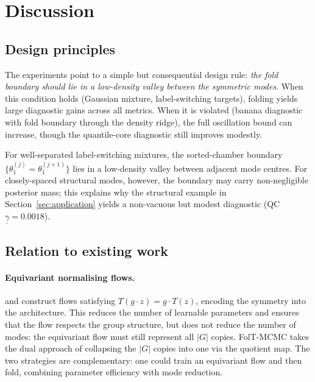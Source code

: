 %  

\section{Discussion}
\label{sec:discussion}


\subsection{Design principles}
\label{sec:disc_design}

The experiments point to a simple but consequential design rule:
\emph{the fold boundary should lie in a low-density valley between
the symmetric modes}.  When this condition holds (Gaussian mixture,
label-switching targets), folding yields large diagnostic gains
across all metrics.  When it is violated (banana diagnostic with
fold boundary through the density ridge), the full oscillation
bound can increase, though the quantile-core diagnostic still
improves modestly.

For well-separated label-switching mixtures, the sorted-chamber
boundary $\{\theta_1^{(j)} = \theta_1^{(j+1)}\}$ lies in a
low-density valley between adjacent mode centres.
For closely-spaced structural modes, however, the boundary may
carry non-negligible posterior mass; this explains why the
structural example in Section~\ref{sec:application} yields a
non-vacuous but modest diagnostic
(QC~$\underline{\gamma} = 0.0018$).


\subsection{Relation to existing work}
\label{sec:disc_related}

\paragraph{Equivariant normalising flows.}
\citet{Kohler2020} and \citet{Rezende2019} construct flows
satisfying $T(g \cdot z) = g \cdot T(z)$, encoding the symmetry
into the architecture.  This reduces the number of learnable
parameters and ensures that the flow respects the group structure,
but does not reduce the number of modes: the equivariant flow must
still represent all $|G|$ copies.  FolT-MCMC takes the dual
approach of collapsing the $|G|$ copies into one via the quotient
map.  The two strategies are complementary: one could train an
equivariant flow and then fold, combining parameter efficiency
with mode reduction.

